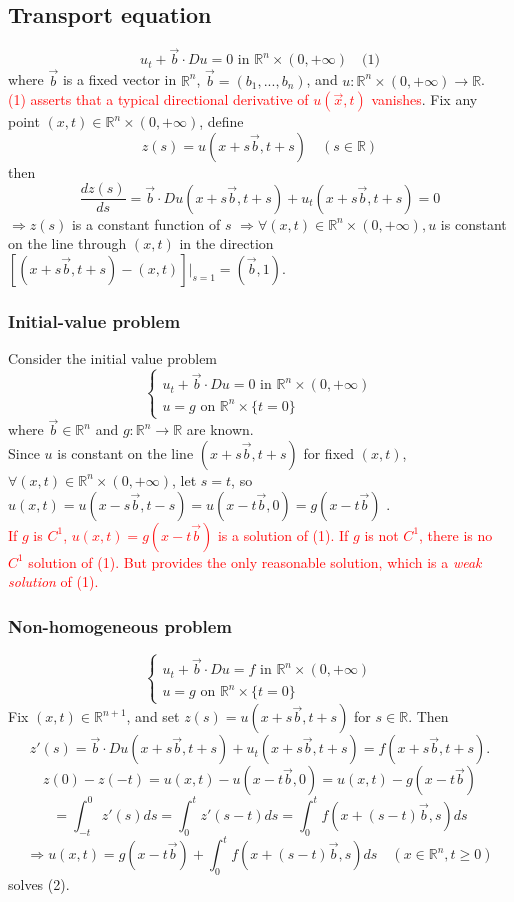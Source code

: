 \documentclass[a4paper,12pt]{report}
\begin{document}
\subsection{Transport equation}
\[u_t + \vec{b} \cdot Du = 0  \text{  in  } \mathbb{R}^n \times (0, +\infty) \quad \text{(1)}\] where \(\vec{b}\) is a fixed vector in \(\mathbb{R}^n\), \(\vec{b} =(b_1, ..., b_n)\), and \(u: \mathbb{R}^n \times (0, +\infty) \to \mathbb{R}\). \\
\textcolor{red}{(1) asserts that a typical directional derivative of \(u(\vec{x}, t)\) vanishes}. Fix any point \((x, t) \in \mathbb{R}^n \times (0, +\infty)\), define \[z(s) = u(x + s\vec{b}, t+s) \quad (s \in \mathbb{R})\] then \[\frac{d z(s)}{ds} = \vec{b} \cdot Du(x+ s\vec{b}, t+s) + u_t(x+ s\vec{b}, t+s) = 0\] \(\Rightarrow z(s)\) is a constant function of \(s\) \(\Rightarrow \forall (x, t) \in \mathbb{R}^n \times (0, +\infty), u\) is constant on the line through \((x, t)\) in the direction \([(x+ s\vec{b}, t+s) - (x, t)]|_{s = 1} = (\vec{b}, 1)\). 
\subsubsection{Initial-value problem}
Consider the initial value problem
\begin{equation}
\begin{cases}
u_t + \vec{b} \cdot Du = 0 \text{ in } \mathbb{R}^n \times (0, +\infty) \\
u = g \text{ on } \mathbb{R}^n \times \{t=0\}
\end{cases}
\end{equation}
where \(\vec{b} \in \mathbb{R}^n\) and \(g: \mathbb{R}^n \to \mathbb{R}\) are known. \\
Since \(u\) is constant on the line \((x+ s\vec{b}, t+s)\) for fixed \((x, t)\), \(\forall (x, t) \in \mathbb{R}^n \times (0, +\infty)\), let \(s = t\), so \(u(x, t) = u(x-s\vec{b}, t-s) = u(x-t\vec{b}, 0) = g(x-t\vec{b})\) . \\
\textcolor{red}{If \(g\) is \(C^1\), \(u(x, t) = g(x-t\vec{b})\) is a solution of (1). If \(g\) is not \(C^1\), there is no \(C^1\) solution of (1). But  provides the only reasonable solution, which is a \textit{weak solution} of (1).} 
\subsubsection{Non-homogeneous problem}
\begin{equation}
\begin{cases}
u_t + \vec{b} \cdot Du = f \text{ in } \mathbb{R}^n \times (0, +\infty) \\
u = g \text{ on } \mathbb{R}^n \times \{t=0\}
\end{cases}
\end{equation} 
Fix \((x,t) \in \mathbb{R}^{n+1}\), and set \(z(s) = u(x + s\vec{b}, t+s)\) for \(s \in \mathbb{R}\). Then \[z'(s) = \vec{b} \cdot Du(x+s\vec{b}, t+s) + u_t (x+s\vec{b}, t+s) = f(x+s\vec{b}, t+s).\] \[z(0) - z(-t) = u(x, t) - u(x-t\vec{b}, 0) = u(x, t) - g(x-t\vec{b})\]
\[= \int_{-t}^{0} z'(s) ds = \int_{0}^{t} z'(s-t) ds = \int_{0}^{t} f(x+(s-t)\vec{b}, s) ds\]
\[\Rightarrow u(x,t) = g(x-t\vec{b}) + \int_{0}^{t} f(x+(s-t)\vec{b}, s) ds \quad (x \in \mathbb{R}^n, t \geq 0)\] solves (2). 
\end{document}

